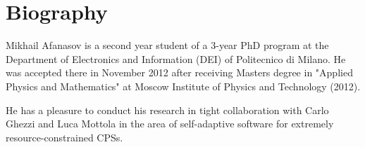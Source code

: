 \section{Biography}

Mikhail Afanasov is a second year student of a 3-year PhD program at the
Department of Electronics and Information (DEI) of Politecnico di Milano. He was
accepted there in November 2012 after receiving Masters degree in "Applied
Physics and Mathematics" at Moscow Institute of Physics and Technology (2012).

He has a pleasure to conduct his research in tight collaboration with Carlo
Ghezzi and Luca Mottola in the area of self-adaptive software for
extremely resource-constrained CPSs.

